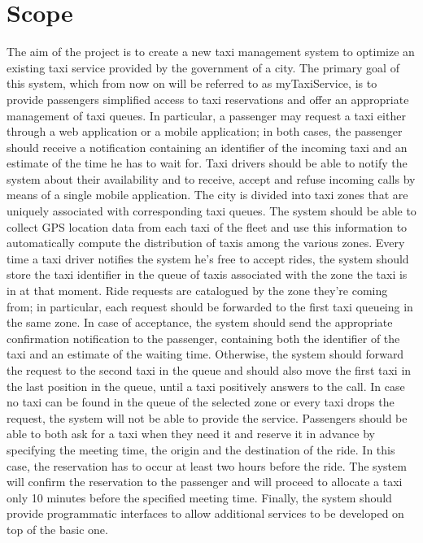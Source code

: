 \section{Scope}
The aim of the project is to create a new taxi management system to optimize an existing taxi service provided by the government of a city. The primary goal of this system, which from now on will be referred to as myTaxiService, is to provide passengers simplified access to taxi reservations and offer an appropriate management of taxi queues. In particular, a passenger may request a taxi either through a web application or a mobile application; in both cases, the passenger should receive a notification containing an identifier of the incoming taxi and an estimate of the time he has to wait for. Taxi drivers should be able to notify the system about their availability and to receive, accept and refuse incoming calls by means of a single mobile application. The city is divided into taxi zones that are uniquely associated with corresponding taxi queues. The system should be able to collect GPS location data from each taxi of the fleet and use this information to automatically compute the distribution of taxis among the various zones. Every time a taxi driver notifies the system he's free to accept rides, the system should store the taxi identifier in the queue of taxis associated with the zone the taxi is in at that moment. Ride requests are catalogued by the zone they're coming from; in particular, each request should be forwarded to the first taxi queueing in the same zone. In case of acceptance, the system should send the appropriate confirmation notification to the passenger, containing both the identifier of the taxi and an estimate of the waiting time. Otherwise, the system should forward the request to the second taxi in the queue and should also move the first taxi in the last position in the queue, until a taxi positively answers to the call. In case no taxi can be found in the queue of the selected zone or every taxi drops the request, the system will not be able to provide the service. Passengers should be able to both ask for a taxi when they need it and reserve it in advance by specifying the meeting time, the origin and the destination of the ride. In this case, the reservation has to occur at least two hours before the ride. The system will confirm the reservation to the passenger and will proceed to allocate a taxi only 10 minutes before the specified meeting time. Finally, the system should provide programmatic interfaces to allow additional services to be developed on top of the basic one.


